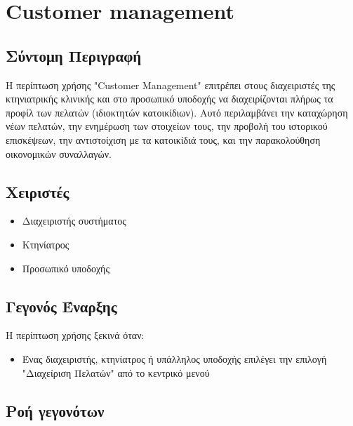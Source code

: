 \documentclass[12pt,a4paper,twoside]{book}
\begin{document}
\section{Customer management}

\subsection{Σύντομη Περιγραφή}
Η περίπτωση χρήσης "Customer Management" επιτρέπει στους διαχειριστές της κτηνιατρικής κλινικής και στο προσωπικό υποδοχής να διαχειρίζονται πλήρως τα προφίλ των πελατών (ιδιοκτητών κατοικίδιων). Αυτό περιλαμβάνει την καταχώρηση νέων πελατών, την ενημέρωση των στοιχείων τους, την προβολή του ιστορικού επισκέψεων, την αντιστοίχιση με τα κατοικίδιά τους, και την παρακολούθηση οικονομικών συναλλαγών.

\subsection{Χειριστές}
\begin{itemize}
  \item Διαχειριστής συστήματος
  \item Κτηνίατρος
  \item Προσωπικό υποδοχής
\end{itemize}

\subsection{Γεγονός Έναρξης}
Η περίπτωση χρήσης ξεκινά όταν:
\begin{itemize}
  \item Ένας διαχειριστής, κτηνίατρος ή υπάλληλος υποδοχής επιλέγει την επιλογή "Διαχείριση Πελατών" από το κεντρικό μενού
\end{itemize}

\subsection{Ροή γεγονότων}
\end{document}
